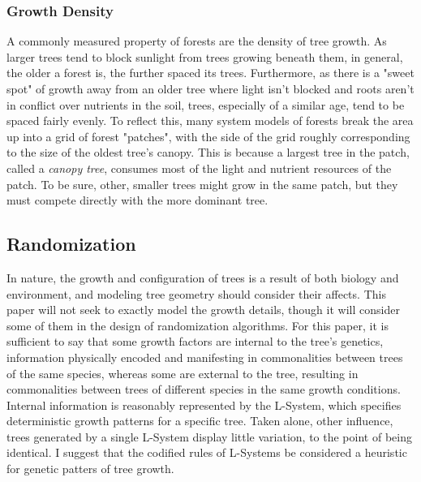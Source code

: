 \documentclass{article}
\newcommand{\tab}{\hspace*{2em}}
\begin{document}
            \subsubsection{Growth Density}
    \tab A commonly measured property of forests are the density of tree growth. As larger trees
tend to block sunlight from trees growing beneath them, in general, the older a forest is, the
further spaced its trees. Furthermore, as there is a "sweet spot" of growth away from an older tree
where light isn't blocked and roots aren't in conflict over nutrients in the soil, trees,
especially of a similar age, tend to be spaced fairly evenly. To reflect this, many system models
of forests break the area up into a grid of forest "patches", with the side of the grid roughly
corresponding to the size of the oldest tree's canopy\cite{moorcroft01}. This is because a largest
tree in the patch, called a \emph{canopy tree}, consumes most of the light and nutrient resources
of the patch. To be sure, other, smaller trees might grow in the same patch, but they must compete
directly with the more dominant tree.


        \subsection{Randomization}
    \tab In nature, the growth and configuration of trees is a result of both biology and
environment, and modeling tree geometry should consider their affects. This paper will not seek to
exactly model the growth details, though it will consider some of them in the design of
randomization algorithms. For this paper, it is sufficient to say that some growth factors are
internal to the tree's genetics, information physically encoded and manifesting in commonalities
between trees of the same species, whereas some are external to the tree, resulting in
commonalities between trees of different species in the same growth conditions\cite{hlt-rmyb}.
Internal information is reasonably represented by the L-System, which specifies deterministic
growth patterns for a specific tree. Taken alone, other influence, trees generated by a single
L-System display little variation, to the point of being identical. I suggest that the codified
rules of L-Systems be considered a heuristic for genetic patters of tree growth.
\end{document}
